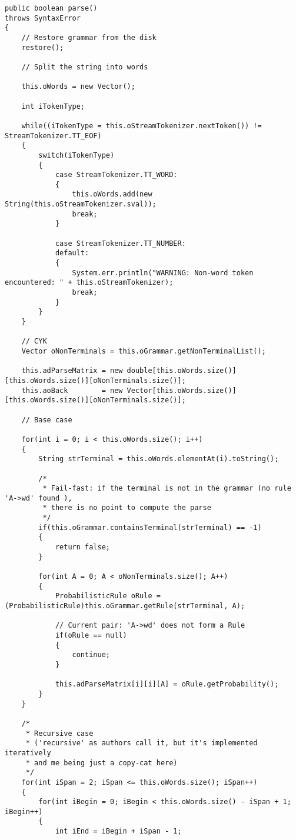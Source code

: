 \tiny
\begin{verbatim}
public boolean parse()
throws SyntaxError
{
    // Restore grammar from the disk
    restore();

    // Split the string into words

    this.oWords = new Vector();

    int iTokenType;

    while((iTokenType = this.oStreamTokenizer.nextToken()) != StreamTokenizer.TT_EOF)
    {
        switch(iTokenType)
        {
            case StreamTokenizer.TT_WORD:
            {
                this.oWords.add(new String(this.oStreamTokenizer.sval));
                break;
            }

            case StreamTokenizer.TT_NUMBER:
            default:
            {
                System.err.println("WARNING: Non-word token encountered: " + this.oStreamTokenizer);
                break;
            }
        }
    }

    // CYK
    Vector oNonTerminals = this.oGrammar.getNonTerminalList();

    this.adParseMatrix = new double[this.oWords.size()][this.oWords.size()][oNonTerminals.size()];
    this.aoBack        = new Vector[this.oWords.size()][this.oWords.size()][oNonTerminals.size()];

    // Base case

    for(int i = 0; i < this.oWords.size(); i++)
    {
        String strTerminal = this.oWords.elementAt(i).toString();

        /*
         * Fail-fast: if the terminal is not in the grammar (no rule 'A->wd' found ),
         * there is no point to compute the parse
         */
        if(this.oGrammar.containsTerminal(strTerminal) == -1)
        {
            return false;
        }

        for(int A = 0; A < oNonTerminals.size(); A++)
        {
            ProbabilisticRule oRule = (ProbabilisticRule)this.oGrammar.getRule(strTerminal, A);

            // Current pair: 'A->wd' does not form a Rule
            if(oRule == null)
            {
                continue;
            }

            this.adParseMatrix[i][i][A] = oRule.getProbability();
        }
    }

    /*
     * Recursive case
     * ('recursive' as authors call it, but it's implemented iteratively
     * and me being just a copy-cat here)
     */
    for(int iSpan = 2; iSpan <= this.oWords.size(); iSpan++)
    {
        for(int iBegin = 0; iBegin < this.oWords.size() - iSpan + 1; iBegin++)
        {
            int iEnd = iBegin + iSpan - 1;


\end{verbatim}
